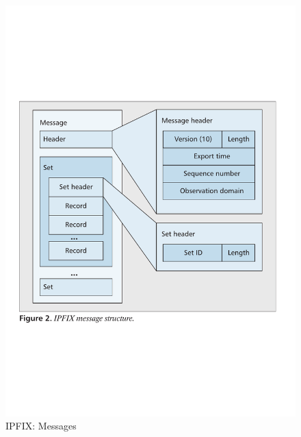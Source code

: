 \begin{figure}[ht]
	\begin{minipage}[b]{0.49\linewidth}
		\centering
		\includegraphics[width=1.0\linewidth]{figures/ipfix-message-structure}
		\caption{IPFIX: Messages \cite{btrammell:2011}}
		\label{fig:ipfix-message-structure}
	\end{minipage}	
	\begin{minipage}[b]{0.49\linewidth}
		\centering

\end{minipage}
\end{figure}
